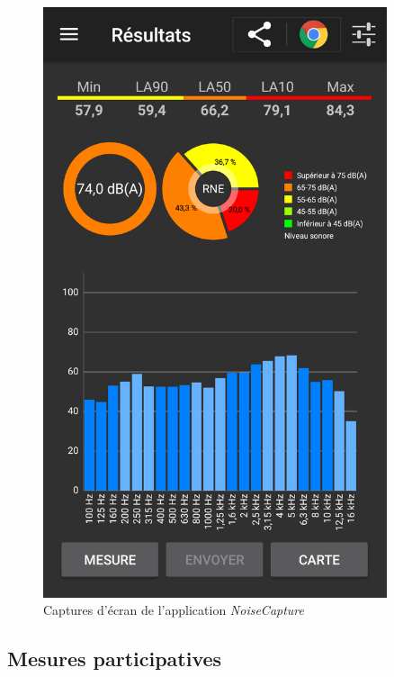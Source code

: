 \begin{figure}[t]
\begin{center}
\begin{minipage}[t]{0.3\textwidth}
        \includegraphics[width=0.9\textwidth]{./figures/autres/noiseCapture2.png}
    \end{minipage}
    \caption{Captures d'écran de l'application \textit{NoiseCapture}}
\end{center}
\end{figure}

\subsection{Mesures participatives}

